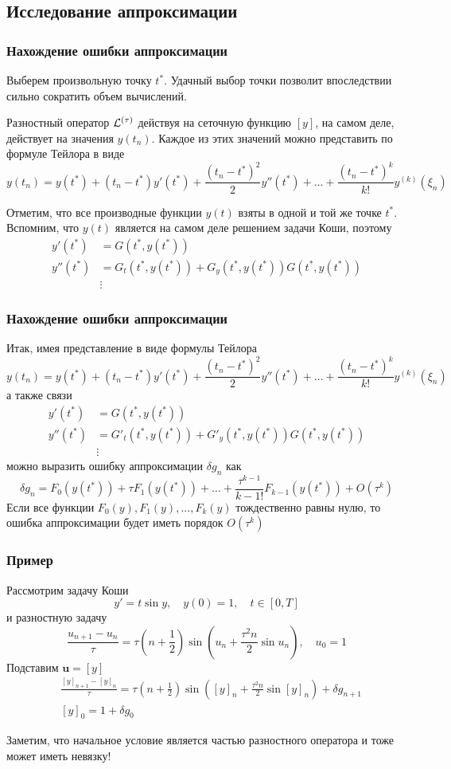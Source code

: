 \documentclass[apectratio=43,unicode]{beamer}
\begin{document}
\subsection{Исследование аппроксимации}
\begin{frame}\frametitle{Нахождение ошибки аппроксимации}
	Выберем произвольную точку $t^*$. Удачный выбор точки позволит впоследствии сильно сократить объем вычислений.
	
	Разностный оператор ${\mathcal{L}^{(\tau)}}$ действуя на сеточную функцию $[y]$, на самом деле, действует на значения $y(t_n)$.
	Каждое из этих значений можно представить по формуле Тейлора в виде
	$$
	y(t_n) = y(t^*) + (t_n-t^*) y'(t^*) + \frac{(t_n-t^*)^2}{2} y''(t^*) + \dots + \frac{(t_n-t^*)^k}{k!} y^{(k)}(\xi_n)
	$$
	
	Отметим, что все производные функции $y(t)$ взяты в одной и той же точке $t^*$. 
	Вспомним, что $y(t)$ является на самом деле	решением задачи Коши, поэтому 
	\begin{align*}
	y'(t^*) &= G(t^*, y(t^*))\\
	y''(t^*) &= G_t(t^*, y(t^*))+G_y(t^*, y(t^*))G(t^*, y(t^*))\\
	&\vdots
	\end{align*}
\end{frame}

\begin{frame}\frametitle{Нахождение ошибки аппроксимации}
	Итак, имея представление в виде формулы Тейлора
	$$
	y(t_n) = y(t^*) + (t_n-t^*) y'(t^*) + \frac{(t_n-t^*)^2}{2} y''(t^*) + \dots + \frac{(t_n-t^*)^k}{k!} y^{(k)}(\xi_n)
	$$
	а также связи
	\begin{align*}
	y'(t^*) &= G(t^*, y(t^*))\\
	y''(t^*) &= G'_t(t^*, y(t^*))+G'_y(t^*, y(t^*))G(t^*, y(t^*))\\
	&\vdots
	\end{align*}
	можно выразить ошибку аппроксимации $\delta g_n$ как 
	$$
	\delta g_n = F_0(y(t^*)) + \tau F_1(y(t^*)) + \dots + \frac{\tau^{k-1}}{{k-1}!} F_{k-1}(y(t^*)) + O(\tau^{k})
	$$
	Если все функции $F_0(y), F_1(y), ..., F_k(y)$ тождественно равны нулю, то ошибка аппроксимации будет иметь порядок $O(\tau^k)$
\end{frame}

\begin{frame}\frametitle{Пример}
	Рассмотрим задачу Коши
	$$
	y' = t \sin y, \quad y(0) = 1, \quad t \in [0, T]
	$$
	и разностную задачу
	$$
	\frac{u_{n+1} - u_n}{\tau} = \tau\left(n+\frac{1}{2}\right)\sin\left(u_n + \frac{\tau^2 n}{2} 
		\sin u_n\right), \quad u_0 = 1
	$$
	Подставим $\mathbf{u} = [y]$
	\begin{align*}
	&\frac{[y]_{n+1} - [y]_n}{\tau} = \tau\left(n+\frac{1}{2}\right)\sin\left([y]_n + \frac{\tau^2 n}{2} 
		\sin [y]_n\right) + \delta g_{n+1}\\
	&[y]_0 = 1 + \delta g_0
	\end{align*}
	
	Заметим, что начальное условие является частью разностного оператора и тоже может иметь невязку!
\end{frame}
\end{document}
